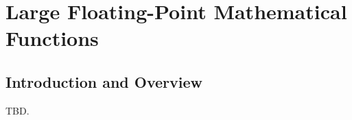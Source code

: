 \chapter[Large Floating-Point Mathematical Functions]
        {Large Floating-Point Mathematical Functions}


\label{claf3}

\section{Introduction and Overview}
\label{claf3:siov0}

TBD.

